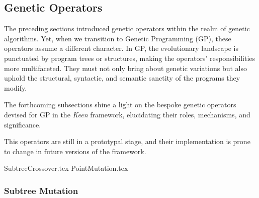 \subsection{Genetic Operators}
\label{sec:keen:gp:op}
  The preceding sections introduced genetic operators within the realm of genetic 
  algorithms. Yet, when we transition to Genetic Programming (GP), these operators 
  assume a different character. In GP, the evolutionary landscape is punctuated by 
  program trees or structures, making the operators' responsibilities more 
  multifaceted. They must not only bring about genetic variations but also uphold 
  the structural, syntactic, and semantic sanctity of the programs they modify.

  The forthcoming subsections shine a light on the bespoke genetic operators 
  devised for GP in the \textit{Keen} framework, elucidating their roles, 
  mechanisms, and significance.

  \begin{remark}
    This operators are still in a prototypal stage, and their implementation
    is prone to change in future versions of the framework.
  \end{remark}

  {SubtreeCrossover.tex}
  {PointMutation.tex}

  \subsubsection{Subtree Mutation}
  \label{sec:keen:op:mut:subtree}
  \Blindtext